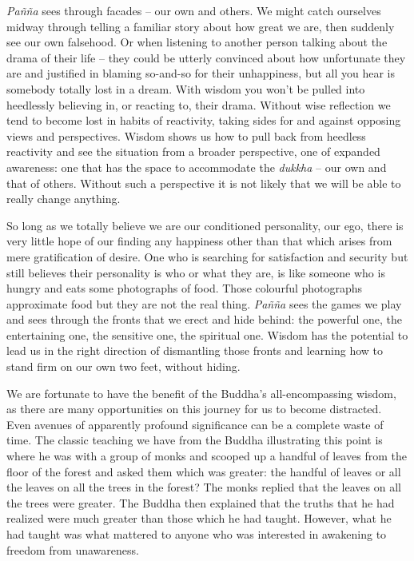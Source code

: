\emph{Pañña} sees through facades -- our own and others. We might catch
ourselves midway through telling a familiar story about how great we
are, then suddenly see our own falsehood. Or when listening to another
person talking about the drama of their life -- they could be utterly
convinced about how unfortunate they are and justified in blaming
so-and-so for their unhappiness, but all you hear is somebody totally
lost in a dream. With wisdom you won't be pulled into heedlessly
believing in, or reacting to, their drama. Without wise reflection we
tend to become lost in habits of reactivity, taking sides for and
against opposing views and perspectives. Wisdom shows us how to pull
back from heedless reactivity and see the situation from a broader
perspective, one of expanded awareness: one that has the space to
accommodate the \emph{dukkha} -- our own and that of others. Without such a
perspective it is not likely that we will be able to really change
anything.

So long as we totally believe we are our conditioned personality, our
ego, there is very little hope of our finding any happiness other than
that which arises from mere gratification of desire. One who is
searching for satisfaction and security but still believes their
personality is who or what they are, is like someone who is hungry and
eats some photographs of food. Those colourful photographs approximate
food but they are not the real thing. \emph{Pañña} sees the games we play and
sees through the fronts that we erect and hide behind: the powerful one,
the entertaining one, the sensitive one, the spiritual one. Wisdom has
the potential to lead us in the right direction of dismantling those
fronts and learning how to stand firm on our own two feet, without
hiding.

We are fortunate to have the benefit of the Buddha's all-encompassing
wisdom, as there are many opportunities on this journey for us to become
distracted. Even avenues of apparently profound significance can be a
complete waste of time. The classic teaching we have from the Buddha
illustrating this point is where he was with a group of monks and
scooped up a handful of leaves from the floor of the forest and asked
them which was greater: the handful of leaves or all the leaves on all
the trees in the forest? The monks replied that the leaves on all the
trees were greater. The Buddha then explained that the truths that he
had realized were much greater than those which he had taught. However,
what he had taught was what mattered to anyone who was interested in
awakening to freedom from unawareness.

